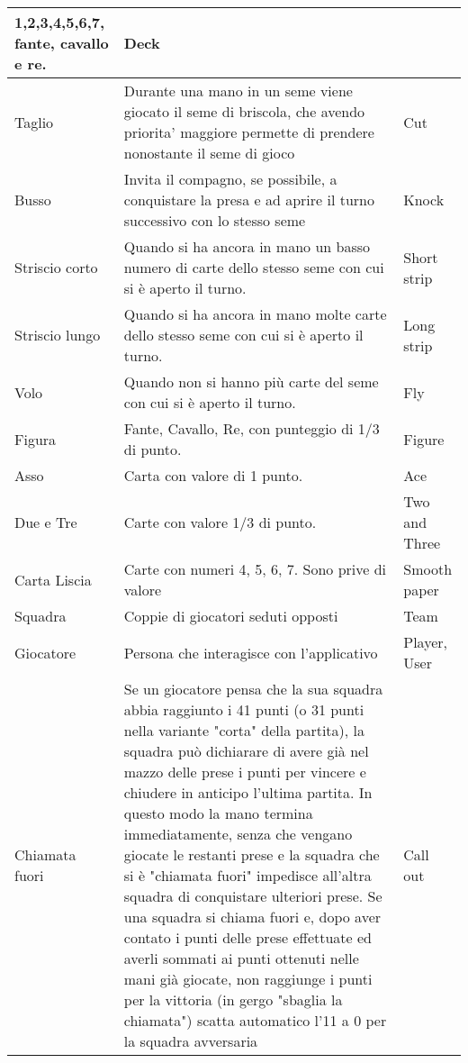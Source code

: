 \begin{table}[!ht]
\begin{tabular}{|l|l|l|}
        1,2,3,4,5,6,7, fante, cavallo e re. & Deck & ~ \\ \hline
        Taglio & Durante una mano in un seme viene giocato il seme di briscola, che avendo priorita’ maggiore permette di prendere nonostante il seme di gioco & Cut \\ \hline
        Busso & Invita il compagno, se possibile, a conquistare la presa e ad aprire il turno successivo con lo stesso seme & Knock \\ \hline
        Striscio corto & Quando si ha ancora in mano un basso numero di carte dello stesso seme con cui si è aperto il turno. & Short strip \\ \hline
        Striscio lungo & Quando si ha ancora in mano molte carte dello stesso seme con cui si è aperto il turno. & Long strip \\ \hline
        Volo & Quando non si hanno più carte del seme con cui si è aperto il turno. & Fly \\ \hline
        Figura & Fante, Cavallo, Re, con punteggio di 1/3 di punto. & Figure \\ \hline
        Asso & Carta con valore di 1 punto. & Ace \\ \hline
        Due e Tre & Carte con valore 1/3 di punto. & Two and Three \\ \hline
        Carta Liscia & Carte con numeri 4, 5, 6, 7. Sono prive di valore & Smooth paper \\ \hline
        Squadra & Coppie di giocatori seduti opposti & Team \\ \hline
        Giocatore & Persona che interagisce con l’applicativo & Player, User \\ \hline
        Chiamata fuori & Se un giocatore pensa che la sua squadra abbia raggiunto i 41 punti (o 31 punti nella variante "corta" della partita), la squadra può  dichiarare di avere già nel mazzo delle prese i punti per vincere e chiudere in anticipo l'ultima partita. In questo modo la mano termina immediatamente, senza che vengano giocate le restanti prese e la squadra che si è "chiamata fuori" impedisce all'altra squadra di conquistare ulteriori prese. Se una squadra si chiama fuori e, dopo aver contato i punti delle prese effettuate ed averli sommati ai punti ottenuti nelle mani già giocate, non raggiunge i punti per la vittoria (in gergo "sbaglia la chiamata") scatta automatico l'11 a 0 per la squadra avversaria & Call out \\ \hline
    \end{tabular}
\end{table}
